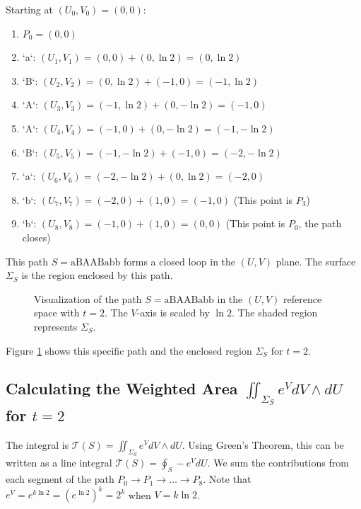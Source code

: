 \documentclass{article}
\begin{document}
Starting at $(U_0, V_0) = (0,0)$:
\begin{enumerate}
    \item $P_0 = (0,0)$
    \item `a`: $(U_1, V_1) = (0,0) + (0, \ln 2) = (0, \ln 2)$
    \item `B`: $(U_2, V_2) = (0, \ln 2) + (-1,0) = (-1, \ln 2)$
    \item `A`: $(U_3, V_3) = (-1, \ln 2) + (0, -\ln 2) = (-1, 0)$
    \item `A`: $(U_4, V_4) = (-1, 0) + (0, -\ln 2) = (-1, -\ln 2)$
    \item `B`: $(U_5, V_5) = (-1, -\ln 2) + (-1,0) = (-2, -\ln 2)$
    \item `a`: $(U_6, V_6) = (-2, -\ln 2) + (0, \ln 2) = (-2, 0)$
    \item `b`: $(U_7, V_7) = (-2, 0) + (1,0) = (-1, 0)$ (This point is $P_3$)
    \item `b`: $(U_8, V_8) = (-1, 0) + (1,0) = (0, 0)$ (This point is $P_0$, the path closes)
\end{enumerate}

This path $S = \text{aBAABabb}$ forms a closed loop in the $(U,V)$ plane. The surface $\Sigma_S$ is the region enclosed by this path.

\begin{figure}[h!]
    \centering
    \resizebox{0.9\textwidth}{!}{} %
    \caption{Visualization of the path $S = \text{aBAABabb}$ in the $(U,V)$ reference space with $t=2$. The $V$-axis is scaled by $\ln 2$. The shaded region represents $\Sigma_S$.}
    \label{fig:uv_path_q2_specific_t2}
\end{figure}

Figure \ref{fig:uv_path_q2_specific_t2} shows this specific path and the enclosed region $\Sigma_S$ for $t=2$.

\subsection{Calculating the Weighted Area $\iint_{\Sigma_S} e^V dV \wedge dU$ for $t=2$}
The integral is $\mathcal{T}(S) = \iint_{\Sigma_S} e^V dV \wedge dU$. Using Green's Theorem, this can be written as a line integral $\mathcal{T}(S) = \oint_S -e^V dU$. We sum the contributions from each segment of the path $P_0 \to P_1 \to \dots \to P_8$. Note that $e^V = e^{k \ln 2} = (e^{\ln 2})^k = 2^k$ when $V = k \ln 2$.
\end{document}
